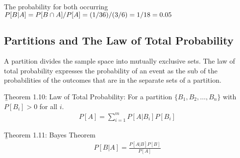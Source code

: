 \documentclass[12pt, titlepage, oneside]{article}
\begin{document}
The probability for both occurring $P[B|A] = P[B \cap A]/P[A] = (1/36)/(3/6) = 1/18 = 0.05$

\subsection{Partitions and The Law of Total Probability}
A partition divides the sample space into mutually exclusive sets. The law of total probability expresses the probability of an event as the sub of the probabilities of the outcomes that are in the separate sets of a partition.

\b{Theorem 1.10}: Law of Total Probability: For a partition $\{B_1,B_2, \dots, B_n\}$ with $P[B_i] > 0$ for all $i$.
\begin{align}
P[A] = \sum_{i=1}^{m} P[A|B_i] P[B_i]
\end{align}

\b{Theorem 1.11}: Bayes Theorem
\begin{align}
P[B|A] = \frac{P[A|B] P[B]}{P[A]}
\end{align}
\end{document}
